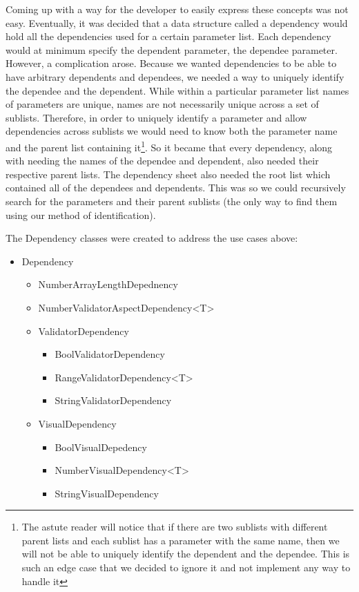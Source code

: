 	Coming up with a way for the developer to easily express these concepts was not easy. Eventually, it was decided that a data structure called
	a dependency would hold all the dependencies used for a certain parameter list. Each dependency would at minimum specify the dependent parameter,
	the dependee parameter. However, a complication arose. Because we wanted dependencies to be able to have arbitrary dependents and dependees, we needed
	a way to uniquely identify the dependee and the dependent. While within a particular parameter list names of parameters are unique, names are not 
	necessarily unique across a set of sublists. Therefore, in order to uniquely identify a parameter and allow dependencies across sublists we would need
	to know both the parameter name and the parent list containing it\footnote{The astute reader will notice that if there are two sublists with different parent lists 
	and each sublist has a parameter with the same name, then we will not be able to uniquely identify the dependent and the dependee. This is such an edge case that we decided
	to ignore it and not implement any way to handle it}. So it became that every dependency, along with needing the names of the dependee
	and dependent, also needed their respective parent lists. The dependency sheet also needed the root list which contained all of the dependees and dependents.
	This was so we could recursively search for the parameters and their parent sublists (the only way to find them using our method of identification). 

	The Dependency classes were created to address the use cases above:
	\begin{itemize}
		\item Dependency
		\begin{itemize}
			\item NumberArrayLengthDepednency
			\item NumberValidatorAspectDependency<T>
			\item ValidatorDependency
			\begin{itemize}
				\item BoolValidatorDependency
				\item RangeValidatorDependency<T>
				\item StringValidatorDependency
			\end{itemize}	
			\item VisualDependency
			\begin{itemize}
				\item BoolVisualDepedency
				\item NumberVisualDependency<T>
				\item StringVisualDependency
			\end{itemize}
		\end{itemize}
	\end{itemize}

